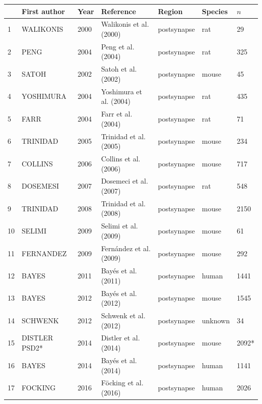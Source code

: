 \begin{table}[]
    \centering
    \begin{tabular}{lllllll}
    \toprule
     & First author & Year & Reference & Region & Species & $n$ \\
    \midrule
1 &    WALIKONIS &2000 &Walikonis et al. (2000)\cite{walikonis2000identification} &postsynapse & rat & 29 \\
2 &PENG&2004&Peng et al. (2004) \cite{peng2004semiquantitative}&postsynapse& rat& 325\\
3 &SATOH&2002&Satoh et al. (2002)\cite{satoh2002identification}&postsynapse &mouse &45\\
4 &YOSHIMURA&2004&Yoshimura et al. (2004)\cite{yoshimura2004molecular} &postsynapse& rat &435\\
5 &FARR&2004&Farr et al. (2004)\cite{farr2004proteomic}&postsynapse &rat &71 \\
6&TRINIDAD&2005 &Trinidad et al. (2005) \cite{trinidad2005phosphorylation}&postsynapse&mouse& 234\\
7&COLLINS&2006&Collins et al. (2006)\cite{collins2006molecular}&postsynapse &mouse& 717\\
8&DOSEMESI&2007&Dosemeci et al. (2007)\cite{dosemeci2007composition}&postsynapse& rat& 548\\
9&TRINIDAD&2008&Trinidad et al. (2008) \cite{trinidad2008quantitative}&postsynapse& mouse& 2150\\
10&SELIMI&2009&Selimi et al. (2009)\cite{selimi2009proteomic} &postsynapse &mouse &61\\
11&FERNANDEZ&2009&Fernández et al. (2009)&postsynapse& mouse &292\\
12&BAYES&2011&Bayés et al. (2011)\cite{bayes2011characterization}&postsynapse &human &1441\\
13&BAYES&2012&Bayés et al. (2012)\cite{bayes2012comparative}  &postsynapse &mouse &1545\\
14&SCHWENK&2012&Schwenk et al. (2012)\cite{schwenk2012high} &postsynapse &unknown &34\\
15&DISTLER PSD2*&2014&Distler et al. (2014)\cite{distler2014depth}&postsynapse& mouse& 2092*\\
16&BAYES&2014&Bayés et al. (2014) \cite{bayes2014human}&postsynapse& human &1141\\
 17&FOCKING&2016&Föcking et al. (2016)\cite{focking2016proteomic}&postsynapse& human &2026\\


\end{tabular}
\end{table}
